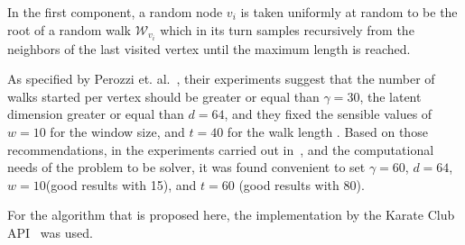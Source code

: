 In the first component, a random node $v_i$ is taken uniformly at random to be the root of a random walk $\mathcal W_{v_i}$ which in its turn samples recursively from the neighbors of the last visited vertex until the maximum length is reached.

As specified by Perozzi et. al.~\citep{deepwalk}, their experiments suggest that the number of walks started per vertex should be greater or equal than $\gamma=30$, the latent dimension greater or equal than $d=64$, and they fixed the sensible values of $w=10$ for the window size, and $t=40$ for the walk length . Based on those recommendations, in the experiments carried out in~\citep{deepwalk_hyper}, and the computational needs of the problem to be solver, it was found convenient to set $\gamma=60$, $d=64$, $w=10$(good results with 15), and $t=60$ (good results with 80).


For the algorithm that is proposed here, the implementation by the Karate Club API~\cite{karateclub} was used.